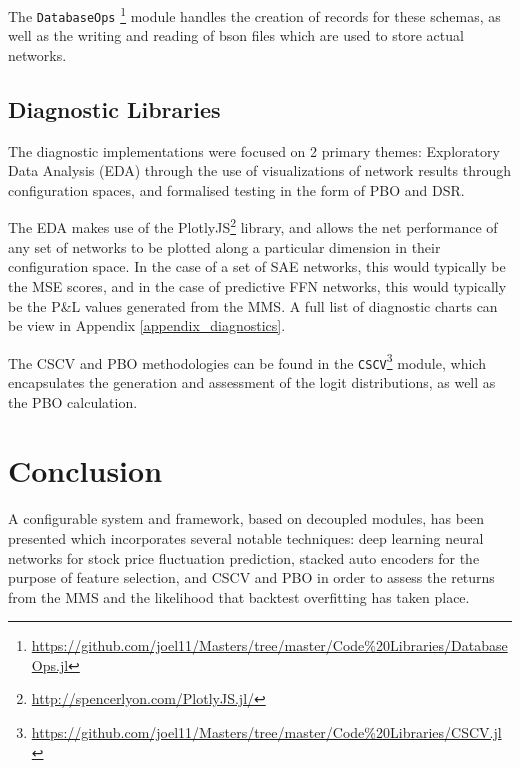 \documentclass[a4paper,11pt,oneside]{article}
\theoremstyle{plain}
\theoremstyle{definition}
\begin{document}
	The \texttt{DatabaseOps} \footnote{\url{https://github.com/joel11/Masters/tree/master/Code\%20Libraries/DatabaseOps.jl}} module handles the creation of records for these schemas, as well as the writing and reading of bson files which are used to store actual networks.
	
	\subsection{Diagnostic Libraries}
	
	The diagnostic implementations were focused on 2 primary themes: Exploratory Data Analysis (EDA) through the use of visualizations of network results through configuration spaces, and formalised testing in the form of PBO and DSR.
	
	The EDA makes use of the PlotlyJS\footnote{\url{http://spencerlyon.com/PlotlyJS.jl/}} library, and allows the net performance of any set of networks to be plotted along a particular dimension in their configuration space. In the case of a set of SAE networks, this would typically be the MSE scores, and in the case of predictive FFN networks, this would typically be the P\&L values generated from the MMS. A full list of diagnostic charts can be view in Appendix \ref{appendix_diagnostics}. \newline
	
	The CSCV and PBO methodologies can be found in the \texttt{CSCV}\footnote{\url{https://github.com/joel11/Masters/tree/master/Code\%20Libraries/CSCV.jl}} module, which encapsulates the generation and assessment of the logit distributions, as well as the PBO calculation.
	
	
	\newpage
	\section{Conclusion}\label{Conclusion}
	
	A configurable system and framework, based on decoupled modules, has been presented which incorporates several notable techniques: deep learning neural networks for stock price fluctuation prediction, stacked auto encoders for the purpose of feature selection, and CSCV and PBO in order to assess the returns from the MMS and the likelihood that backtest overfitting has taken place. \newline 
	
\end{document}
